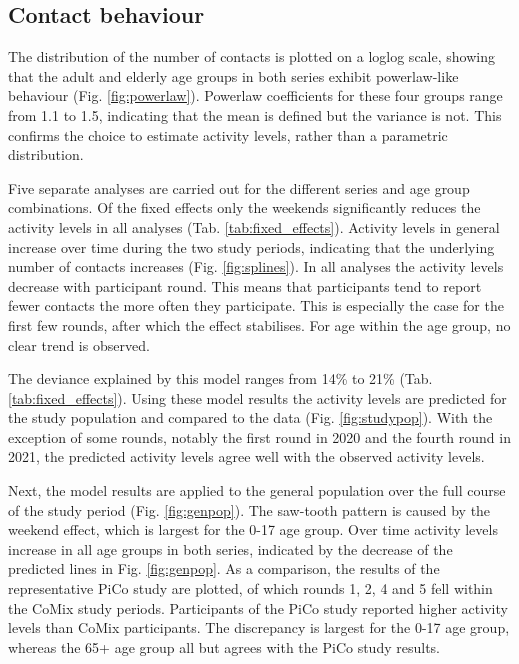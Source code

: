 \documentclass[fleqn,10pt]{wlscirep}
\begin{document}
\subsection*{Contact behaviour}

The distribution of the number of contacts is plotted on a loglog scale, showing that the adult and elderly age groups in both series exhibit powerlaw-like behaviour (Fig. \ref{fig:powerlaw}). Powerlaw coefficients for these four groups range from 1.1 to 1.5, indicating that the mean is defined but the variance is not. This confirms the choice to estimate activity levels, rather than a parametric distribution.

Five separate analyses are carried out for the different series and age group combinations. Of the fixed effects only the weekends significantly reduces the activity levels in all analyses (Tab. \ref{tab:fixed_effects}). Activity levels in general increase over time during the two study periods, indicating that the underlying number of contacts increases (Fig. \ref{fig:splines}). In all analyses the activity levels decrease with participant round. This means that participants tend to report fewer contacts the more often they participate. This is especially the case for the first few rounds, after which the effect stabilises. For age within the age group, no clear trend is observed.

The deviance explained by this model ranges from 14\% to 21\% (Tab. \ref{tab:fixed_effects}). Using these model results the activity levels are predicted for the study population and compared to the data (Fig. \ref{fig:studypop}). With the exception of some rounds, notably the first round in 2020 and the fourth round in 2021, the predicted activity levels agree well with the observed activity levels.

Next, the model results are applied to the general population over the full course of the study period (Fig. \ref{fig:genpop}). The saw-tooth pattern is caused by the weekend effect, which is largest for the 0-17 age group. Over time activity levels increase in all age groups in both series, indicated by the decrease of the predicted lines in Fig. \ref{fig:genpop}. As a comparison, the results of the representative PiCo study \cite{Backer_2021} are plotted, of which rounds 1, 2, 4 and 5 fell within the CoMix study periods. Participants of the PiCo study reported higher activity levels than CoMix participants. The discrepancy is largest for the 0-17 age group, whereas the 65+ age group all but agrees with the PiCo study results.
\end{document}

